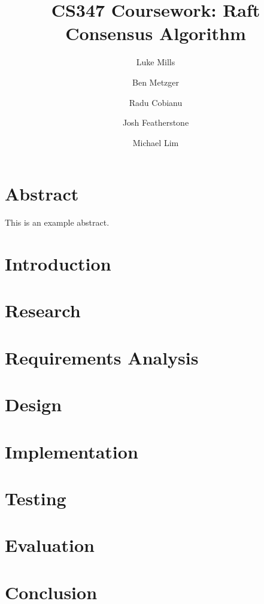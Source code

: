 \documentclass{article}
\title{CS347 Coursework: Raft Consensus Algorithm}
\author{Luke Mills \and Ben Metzger \and Radu Cobianu \and Josh Featherstone \and Michael Lim}
\begin{document}
\maketitle

\section{Abstract}

This is an example abstract.

\section{Introduction}

\section{Research}

\section{Requirements Analysis}

\section{Design}

\section{Implementation}

\section{Testing}

\section{Evaluation}

\section{Conclusion}



\end{document}
